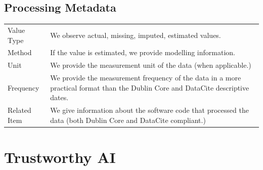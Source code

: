\documentclass[
  a4paper,
  openany, a4paper, oneside]{book}
\begin{document}
\hypertarget{processing-metadata}{%
\section{Processing Metadata}\label{processing-metadata}}

\begin{longtable}[]{@{}
  >{\raggedright\arraybackslash}p{}
  >{\centering\arraybackslash}p{}@{}}
\toprule
& \\
\midrule
\endhead
Value Type & We observe actual, missing, imputed, estimated values. \\
Method & If the value is estimated, we provide modelling information. \\
Unit & We provide the measurement unit of the data (when applicable.) \\
Frequency & We provide the measurement frequency of the data in a more practical format than the Dublin Core and DataCite descriptive dates. \\
Related Item & We give information about the software code that processed the data (both Dublin Core and DataCite compliant.) \\
\bottomrule
\end{longtable}

\hypertarget{trustworhty-ai}{%
\chapter{Trustworthy AI}\label{trustworhty-ai}}
\end{document}
